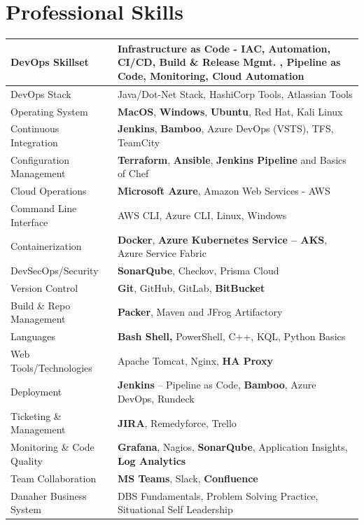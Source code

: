 \documentclass[11pt, a4paper]{article}
\begin{document}
\section*{\color{NavyBlue}Professional Skills}
\vspace{-1.5mm}
\noindent\begin{tabular}{|>{\columncolor[gray]{0.9}}p{1.8in}|p{4.7in}|}
\hline
DevOps Skillset & Infrastructure as Code - IAC, Automation, CI/CD, Build \& Release Mgmt. , Pipeline as Code, Monitoring, Cloud Automation\\
\hline
DevOps Stack & Java/Dot-Net Stack, HashiCorp Tools, Atlassian Tools \\
\hline
Operating System & \textbf{MacOS}, \textbf{Windows}, \textbf{Ubuntu}, Red Hat, Kali Linux \\
\hline
Continuous Integration & \textbf{Jenkins}, \textbf{Bamboo}, Azure DevOps (VSTS), TFS, TeamCity \\
\hline
Configuration Management 	& \textbf{Terraform}, \textbf{Ansible}, \textbf{Jenkins Pipeline} and Basics of Chef \\
\hline
Cloud Operations 	& \textbf{Microsoft Azure}, Amazon Web Services - AWS \\
\hline
Command Line Interface & AWS CLI, Azure CLI, Linux, Windows \\
\hline
Containerization  & \textbf{Docker}, \textbf{Azure Kubernetes Service – AKS}, Azure Service Fabric \\
\hline
DevSecOps/Security & \textbf{SonarQube},  Checkov, Prisma Cloud \\
\hline
Version Control & \textbf{Git}, GitHub, GitLab, \textbf{BitBucket} \\
\hline
Build \& Repo Management  & \textbf{Packer}, Maven and JFrog Artifactory \\
\hline
Languages	 & \textbf{Bash Shell,} PowerShell, C++, KQL, Python Basics \\
\hline
Web Tools/Technologies  & Apache Tomcat, Nginx, \textbf{HA Proxy} \\
\hline
Deployment & \textbf{Jenkins} – Pipeline as Code, \textbf{Bamboo}, Azure DevOps, Rundeck \\
\hline
Ticketing \& Management  & \textbf{JIRA}, Remedyforce, Trello \\
\hline
Monitoring \& Code Quality	 & \textbf{Grafana}, Nagios, \textbf{SonarQube}, Application Insights, \textbf{Log Analytics} \\
\hline
Team Collaboration & \textbf{MS Teams}, Slack, \textbf{Confluence} \\
\hline
Danaher Business System &	DBS Fundamentals, Problem Solving Practice,  Situational Self Leadership\\
\hline
\end{tabular}
\end{document}
